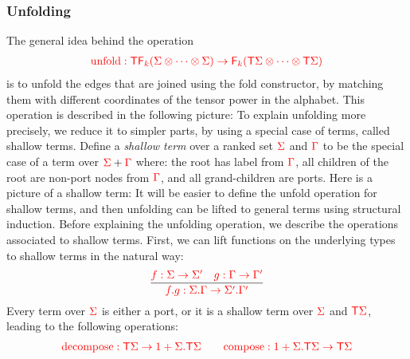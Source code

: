 
\subsubsection{Unfolding}
The general idea behind the  operation 
\begin{align*}
    {\color{red}{{\color{red}{\mathrm{unfold}}}: {\color{red}{\mathsf T}}{\color{red}{\mathsf F_{k}}}(\Sigma \otimes \cdots \otimes \Sigma) \to {\color{red}{\mathsf F_{k}}}( {\color{red}{\mathsf T}}{\color{red}{\Sigma}}\otimes \cdots \otimes {\color{red}{\mathsf T}}{\color{red}{\Sigma}})}} 
\end{align*}
is to unfold the edges that are joined using the fold constructor, by matching them with different coordinates of the tensor power in the alphabet. This operation is described in the following picture:
To explain unfolding more precisely, we reduce it to simpler parts, by using a special case of terms, called shallow terms. Define a \emph{shallow term} over a ranked set ${\color{red}{\Sigma}}$ and ${\color{red}{\Gamma}}$ to be the special case of  a term over ${\color{red}{\Sigma}} + {\color{red}{\Gamma}}$ where:  the root has label from ${\color{red}{\Gamma}}$, all children of the root are non-port nodes from ${\color{red}{\Gamma}}$, and all grand-children are ports. Here is a picture of a shallow term:
It will be easier to define the unfold operation for shallow terms, and then unfolding can be lifted to general terms using structural induction. 
Before explaining the unfolding operation, we describe  the operations associated to shallow terms. First, we can lift functions on the underlying types to shallow terms in the natural way:
\begin{align*}
    \frac
    { {\color{red}{f : \Sigma \to \Sigma'}} \quad {\color{red}{g : \Gamma \to \Gamma'}}}
    {{\color{red}{{\color{red}{f . g}} : {\color{red}{\Sigma . \Gamma}} \to {\color{red}{\Sigma' . \Gamma'}}}}}
\end{align*}
Every term over ${\color{red}{\Sigma}}$ is either a port, or it is a shallow term over ${\color{red}{\Sigma}}$ and ${\color{red}{\mathsf T}} {\color{red}{\Sigma}}$, leading to the following operations:
\begin{align*}
    {\color{red}{{\color{red}{\mathrm{decompose}}}: {\color{red}{\mathsf T}}\Sigma \to 1 +  
{\color{red}{\Sigma . {\color{red}{\mathsf T}}\Sigma}}}} \qquad  {\color{red}{{\color{red}{\mathrm{compose}}}: 1 +  
{\color{red}{\Sigma . {\color{red}{\mathsf T}}\Sigma}} \to {\color{red}{\mathsf T}}\Sigma }}
\end{align*}

